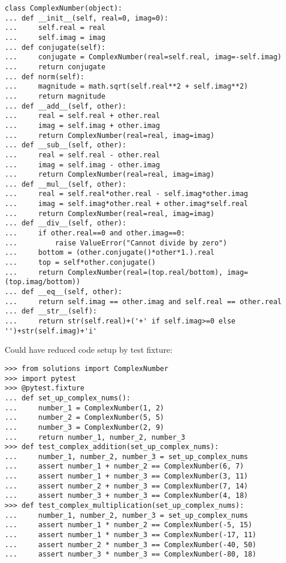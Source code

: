 \begin{lstlisting}
class ComplexNumber(object):
... def __init__(self, real=0, imag=0):
...     self.real = real
...     self.imag = imag
... def conjugate(self):
...     conjugate = ComplexNumber(real=self.real, imag=-self.imag)
...     return conjugate
... def norm(self):
...     magnitude = math.sqrt(self.real**2 + self.imag**2)
...     return magnitude
... def __add__(self, other):
...     real = self.real + other.real
...     imag = self.imag + other.imag
...     return ComplexNumber(real=real, imag=imag)
... def __sub__(self, other):
...     real = self.real - other.real
...     imag = self.imag - other.imag
...     return ComplexNumber(real=real, imag=imag)
... def __mul__(self, other):
...     real = self.real*other.real - self.imag*other.imag
...     imag = self.imag*other.real + other.imag*self.real
...     return ComplexNumber(real=real, imag=imag)
... def __div__(self, other):
...     if other.real==0 and other.imag==0:
...         raise ValueError("Cannot divide by zero")
...     bottom = (other.conjugate()*other*1.).real
...     top = self*other.conjugate()
...     return ComplexNumber(real=(top.real/bottom), imag=(top.imag/bottom))
... def __eq__(self, other):
...     return self.imag == other.imag and self.real == other.real
... def __str__(self):
...     return str(self.real)+('+' if self.imag>=0 else '')+str(self.imag)+'i'
\end{lstlisting}
Could have reduced code setup by test fixture:
\begin{lstlisting}
>>> from solutions import ComplexNumber
>>> import pytest
>>> @pytest.fixture
... def set_up_complex_nums():
...     number_1 = ComplexNumber(1, 2)
...     number_2 = ComplexNumber(5, 5)
...     number_3 = ComplexNumber(2, 9)
...     return number_1, number_2, number_3
>>> def test_complex_addition(set_up_complex_nums):
...     number_1, number_2, number_3 = set_up_complex_nums
...     assert number_1 + number_2 == ComplexNumber(6, 7)
...     assert number_1 + number_3 == ComplexNumber(3, 11)
...     assert number_2 + number_3 == ComplexNumber(7, 14)
...     assert number_3 + number_3 == ComplexNumber(4, 18)
>>> def test_complex_multiplication(set_up_complex_nums):
...     number_1, number_2, number_3 = set_up_complex_nums
...     assert number_1 * number_2 == ComplexNumber(-5, 15)
...     assert number_1 * number_3 == ComplexNumber(-17, 11)
...     assert number_2 * number_3 == ComplexNumber(-40, 50)
...     assert number_3 * number_3 == ComplexNumber(-80, 18)
\end{lstlisting}

